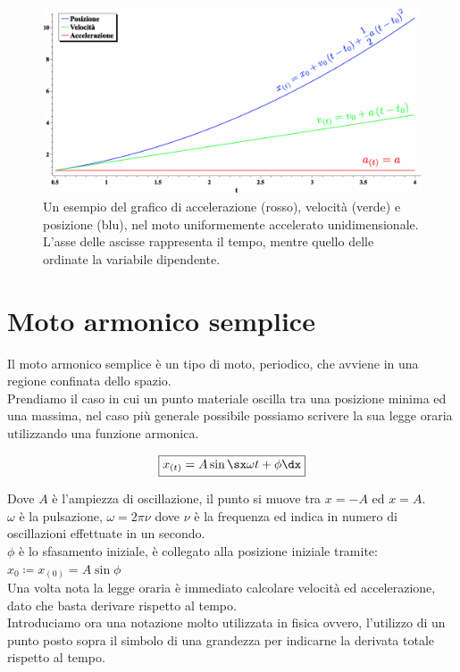 \begin{figure}[htbp]
\begin{center}
\includegraphics[width=13cm]{images/Motorettunifacc1.png} 
\caption{Un esempio del grafico di accelerazione (rosso), velocità (verde) e posizione (blu), nel moto uniformemente accelerato unidimensionale. L'asse delle ascisse rappresenta il tempo, mentre quello delle ordinate la variabile dipendente.}
\label{default}
\end{center}
\end{figure}




\section{Moto armonico semplice}
Il moto armonico semplice è un tipo di moto, periodico, che avviene in una regione confinata dello spazio.\\
Prendiamo il caso in cui un punto materiale oscilla tra una posizione minima ed una massima, nel caso più generale possibile possiamo scrivere la sua legge oraria utilizzando una funzione armonica.




\begin{equation}
\boxed{x_{(t)} = A\sin\sx \omega t +\phi\dx}
\end{equation}

Dove $A$ è l'ampiezza di oscillazione, il punto si muove tra $ x = -A$ ed $x = A$.\\
$\omega$ è la pulsazione, $\omega = 2\pi\nu$ dove $\nu$ è la frequenza ed indica in numero di oscillazioni effettuate in un secondo. \\
$\phi$ è lo sfasamento iniziale, è collegato alla posizione iniziale tramite: $ x_0 \coloneqq x_{(0)} = A\sin\phi$\\
Una volta nota la legge oraria è immediato calcolare velocità ed accelerazione, dato che basta derivare rispetto al tempo.\\
Introduciamo ora una notazione molto utilizzata in fisica ovvero, l'utilizzo di un punto posto sopra il simbolo di una grandezza per indicarne la derivata totale rispetto al tempo.

